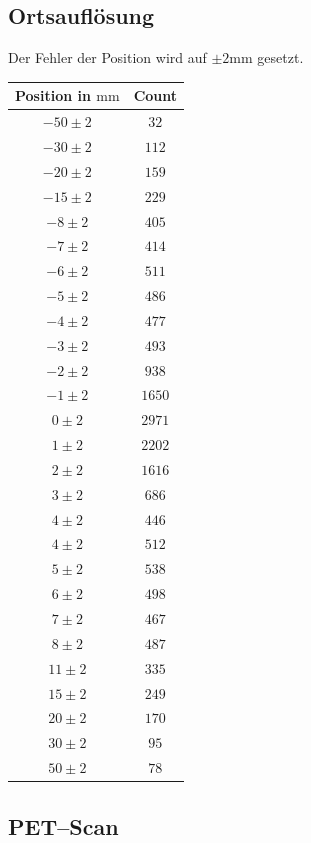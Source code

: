 \documentclass[12pt,a4paper]{scrartcl}
\numberwithin{equation}{section} %
\newcommand{\pu}[1]{\ensuremath{\mathrm{#1}}}
\renewcommand{\[}{} %
\renewcommand{\]}{\noindent} %
\begin{document}
\hypertarget{ortsaufluxf6sung}{%
\subsection{Ortsauflösung}\label{ortsaufluxf6sung}}

Der Fehler der Position wird auf \(\pu{\pm 2 mm}\) gesetzt.

\begin{tabular}[]{c|c}
Position in \(\pu{mm}\) & Count \\
\hline
\(-50\pm 2\) & \(32\) \\
\(-30\pm 2\) & \(112\) \\
\(-20\pm 2\) & \(159\) \\
\(-15\pm 2\) & \(229\) \\
\(-8\pm 2\) & \(405\) \\
\(-7\pm 2\) & \(414\) \\
\(-6\pm 2\) & \(511\) \\
\(-5\pm 2\) & \(486\) \\
\(-4\pm 2\) & \(477\) \\
\(-3\pm 2\) & \(493\) \\
\(-2\pm 2\) & \(938\) \\
\(-1\pm 2\) & \(1650\) \\
\(0\pm 2\) & \(2971\) \\
\(1\pm 2\) & \(2202\) \\
\(2\pm 2\) & \(1616\) \\
\(3\pm 2\) & \(686\) \\
\(4\pm 2\) & \(446\) \\
\(4\pm 2\) & \(512\) \\
\(5\pm 2\) & \(538\) \\
\(6\pm 2\) & \(498\) \\
\(7\pm 2\) & \(467\) \\
\(8\pm 2\) & \(487\) \\
\(11\pm 2\) & \(335\) \\
\(15\pm 2\) & \(249\) \\
\(20\pm 2\) & \(170\) \\
\(30\pm 2\) & \(95\) \\
\(50\pm 2\) & \(78\) \\
\end{tabular}

\hypertarget{petscan}{%
\subsection{PET--Scan}\label{petscan}}
\end{document}
